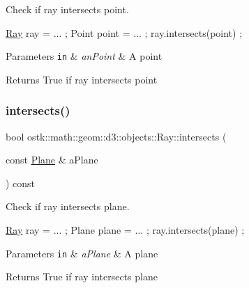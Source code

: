 Check if ray intersects point. 


\begin{DoxyCode}
\hyperlink{classostk_1_1math_1_1geom_1_1d3_1_1objects_1_1_ray_a78335698f8a4f72e613e607b13121df0}{Ray} ray = ... ;
Point point = ... ;
ray.intersects(point) ;
\end{DoxyCode}



\begin{DoxyParams}[1]{Parameters}
\mbox{\tt in}  & {\em an\+Point} & A point \\
\hline
\end{DoxyParams}
\begin{DoxyReturn}{Returns}
True if ray intersects point 
\end{DoxyReturn}
\mbox{\label{classostk_1_1math_1_1geom_1_1d3_1_1objects_1_1_ray_a8eb58fe0f0aaa491008112f411b49c33}} 
\subsubsection{\texorpdfstring{intersects()}{intersects()}\hspace{0.1cm}{\footnotesize\ttfamily [2/4]}}
{\footnotesize\ttfamily bool ostk\+::math\+::geom\+::d3\+::objects\+::\+Ray\+::intersects (\begin{DoxyParamCaption}\item[{const \hyperlink{classostk_1_1math_1_1geom_1_1d3_1_1objects_1_1_plane}{Plane} \&}]{a\+Plane }\end{DoxyParamCaption}) const}



Check if ray intersects plane. 


\begin{DoxyCode}
\hyperlink{classostk_1_1math_1_1geom_1_1d3_1_1objects_1_1_ray_a78335698f8a4f72e613e607b13121df0}{Ray} ray = ... ;
Plane plane = ... ;
ray.intersects(plane) ;
\end{DoxyCode}



\begin{DoxyParams}[1]{Parameters}
\mbox{\tt in}  & {\em a\+Plane} & A plane \\
\hline
\end{DoxyParams}
\begin{DoxyReturn}{Returns}
True if ray intersects plane 
\end{DoxyReturn}
\mbox{\label{classostk_1_1math_1_1geom_1_1d3_1_1objects_1_1_ray_a0b01dbc44a2f8afdbef8495ab09d7457}} 

